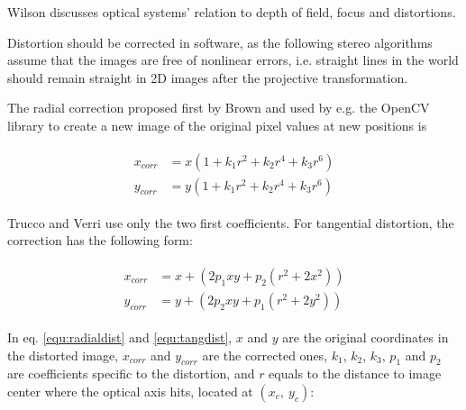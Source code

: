 Wilson \cite{wilson2004anton} discusses optical systems' relation to depth of field, focus and distortions.


Distortion should be corrected in software, as the following stereo algorithms assume that the images are free of nonlinear errors, i.e. straight lines in the world should remain straight in 2D images after the projective transformation.

The radial correction proposed first by Brown \cite{brown1966decentering} and used by e.g. the OpenCV library \cite{opencv} to create a new image of the original pixel values at new positions is

\begin{align} \label{equ:radialdist} \begin{split}
	x_{corr} &= x(1 + k_1 r^2 + k_2 r^4 + k_3 r^6)\\
	y_{corr} &= y(1 + k_1 r^2 + k_2 r^4 + k_3 r^6)
\end{split} \end{align}


Trucco and Verri \cite{trucco1998introductory} use only the two first coefficients.
For tangential distortion, the correction has the following form:

\begin{align} \label{equ:tangdist} \begin{split}
x_{corr} &= x + (2 p_1 x y + p_2 (r^2 + 2 x^2))\\
y_{corr} &= y + (2 p_2 x y + p_1 (r^2 + 2 y^2))
\end{split} \end{align}

In eq. \ref{equ:radialdist} and \ref{equ:tangdist}, $x$ and $y$ are the original coordinates in the distorted image, $x_{corr}$ and $y_{corr}$ are the corrected ones, $k_1$, $k_2$, $k_3$, $p_1$ and $p_2$ are coefficients specific to the distortion, and $r$ equals to the distance to image center where the optical axis hits, located at $(x_c,~y_c)$:

